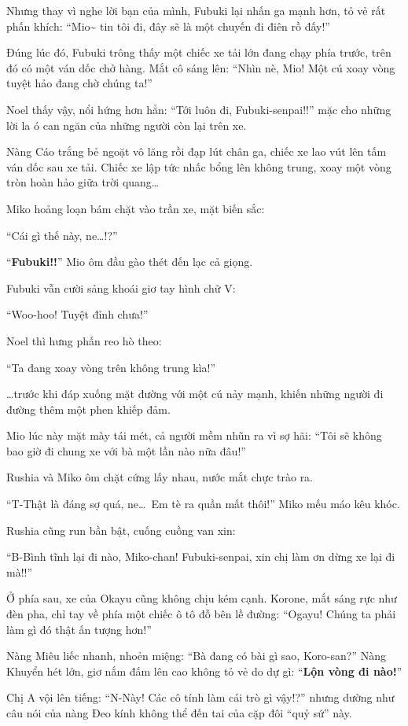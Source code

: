 \documentclass[../main.tex]{subfiles}
\begin{document}
Nhưng thay vì nghe lời bạn của mình, Fubuki lại nhấn ga mạnh hơn, tỏ vẻ rất phấn khích: ``Mio\~{} tin tôi đi, đây sẽ là một chuyến đi điên rồ đấy!''

Đúng lúc đó, Fubuki trông thấy một chiếc xe tải lớn đang chạy phía trước, trên đó có một ván dốc chở hàng. Mắt cô sáng lên: ``Nhìn nè, Mio! Một cú xoay vòng tuyệt hảo đang chờ chúng ta!''

Noel thấy vậy, nổi hứng hơn hẳn: ``Tới luôn đi, Fubuki-senpai!!'' mặc cho những lời la ó can ngăn của những người còn lại trên xe.

Nàng Cáo trắng bẻ ngoặt vô lăng rồi đạp lút chân ga, chiếc xe lao vút lên tấm ván dốc sau xe tải. Chiếc xe lập tức nhấc bổng lên không trung, xoay một vòng tròn hoàn hảo giữa trời quang\dots

Miko hoảng loạn bám chặt vào trần xe, mặt biến sắc:

``Cái gì thế này, ne\dots!?''

``\textbf{Fubuki!!}'' Mio ôm đầu gào thét đến lạc cả giọng.

Fubuki vẫn cười sảng khoái giơ tay hình chữ V:

``Woo-hoo! Tuyệt đỉnh chưa!''

Noel thì hưng phấn reo hò theo:

``Ta đang xoay vòng trên không trung kìa!''

\dots trước khi đáp xuống mặt đường với một cú nảy mạnh, khiến những người đi đường thêm một phen khiếp đảm.

Mio lúc này mặt mày tái mét, cả người mềm nhũn ra vì sợ hãi: ``Tôi sẽ không bao giờ đi chung xe với bà một lần nào nữa đâu!''

Rushia và Miko ôm chặt cứng lấy nhau, nước mắt chực trào ra.

``T-Thật là đáng sợ quá, ne\dots\ Em tè ra quần mất thôi!'' Miko mếu máo kêu khóc.

Rushia cũng run bần bật, cuống cuồng van xin:

``B-Bình tĩnh lại đi nào, Miko-chan! Fubuki-senpai, xin chị làm ơn dừng xe lại đi mà!!''

Ở phía sau, xe của Okayu cũng không chịu kém cạnh. Korone, mắt sáng rực như đèn pha, chỉ tay về phía một chiếc ô tô đỗ bên lề đường: ``Ogayu! Chúng ta phải làm gì đó thật ấn tượng hơn!''

Nàng Miêu liếc nhanh, nhoẻn miệng: ``Bà đang có bài gì sao, Koro-san?'' Nàng Khuyển hét lớn, giơ nắm đấm lên cao không tỏ vẻ do dự gì: ``\textbf{Lộn vòng đi nào!}''

Chị A vội lên tiếng: ``N-Này! Các cô tính làm cái trò gì vậy!?'' nhưng dường như câu nói của nàng Đeo kính không thể đến tai của cặp đôi ``quỷ sứ'' này.
\end{document}
